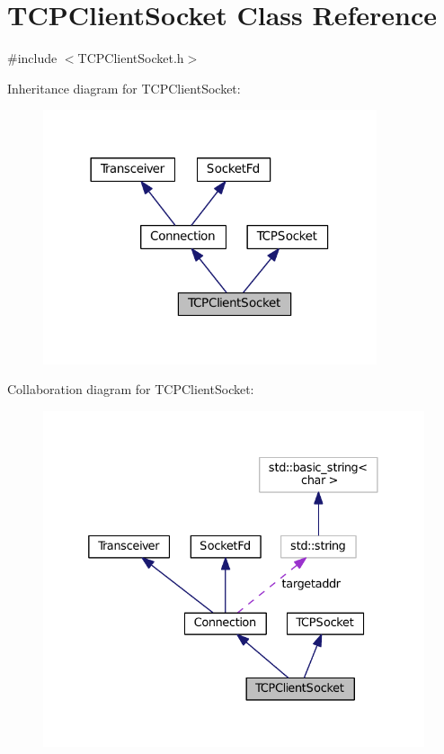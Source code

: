 \hypertarget{classTCPClientSocket}{\section{T\+C\+P\+Client\+Socket Class Reference}
\label{classTCPClientSocket}
}


{\ttfamily \#include $<$T\+C\+P\+Client\+Socket.\+h$>$}



Inheritance diagram for T\+C\+P\+Client\+Socket\+:
\nopagebreak
\begin{figure}[H]
\begin{center}
\leavevmode
\includegraphics[width=278pt]{classTCPClientSocket__inherit__graph}
\end{center}
\end{figure}


Collaboration diagram for T\+C\+P\+Client\+Socket\+:
\nopagebreak
\begin{figure}[H]
\begin{center}
\leavevmode
\includegraphics[width=332pt]{classTCPClientSocket__coll__graph}
\end{center}
\end{figure}
